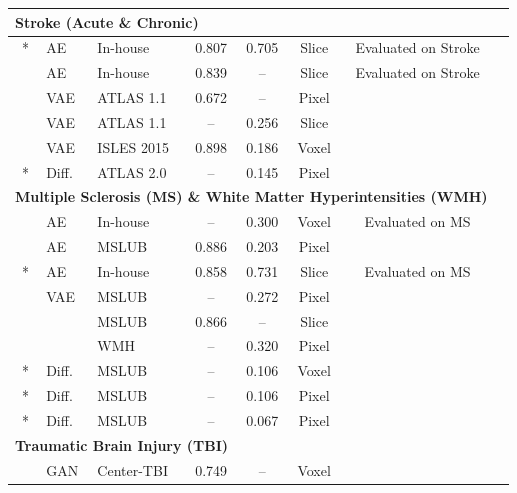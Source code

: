 \begin{longtable}{lp{1.2cm}lccccp{4.5cm}}
\multicolumn{7}{l}{\textbf{Stroke (Acute \& Chronic)}} \\
\midrule
\citet{Luo2023}~* & AE & In-house & 0.807 & 0.705 & Slice & Evaluated on Stroke\\
\citet{Qu2026} & AE & In-house & 0.839 & -- & Slice & Evaluated on Stroke\\
\citet{Sato2019} & VAE & ATLAS 1.1 & 0.672 & -- & Pixel & \\
\citet{Bengs2021} & VAE & ATLAS 1.1 & -- & 0.256 & Slice & \\
\citet{Lüth2023} & VAE & ISLES 2015 & 0.898 & 0.186 & Voxel & \\
\citet{Bercea2023}~* & Diff. & ATLAS 2.0 & -- & 0.145 & Pixel & \\
\hline

\multicolumn{7}{l}{\textbf{Multiple Sclerosis (MS) \& White Matter Hyperintensities (WMH)}} \\
\midrule
\citet{Baur2021-2} & AE & In-house & -- & 0.300 & Voxel & Evaluated on MS \\
\citet{Ghorbel2023} & AE & MSLUB & 0.886 & 0.203 & Pixel & \\
\citet{Luo2023}~* & AE & In-house & 0.858 & 0.731 & Slice & Evaluated on MS\\
\citet{Pinaya2022-2} & VAE & MSLUB & -- & 0.272 & Pixel & \\
 & & MSLUB & 0.866 & -- & Slice & \\
 & & WMH & -- & 0.320 & Pixel & \\
\citet{Behrendt2023}~* & Diff. & MSLUB & -- & 0.106 & Voxel & \\
\citet{Iqbal2023}~* & Diff. & MSLUB & -- & 0.106 & Pixel & \\
\citet{Kumar2024}~* & Diff. & MSLUB & -- & 0.067 & Pixel & \\
\hline

\multicolumn{7}{l}{\textbf{Traumatic Brain Injury (TBI)}} \\
\midrule
\citet{Simarro2020} & GAN & Center-TBI & 0.749 & -- & Voxel & \\
\end{longtable}
